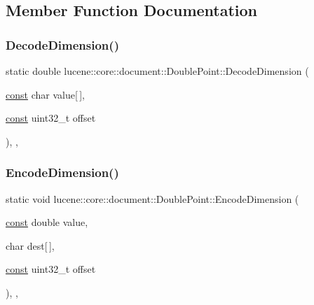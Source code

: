 \subsection{Member Function Documentation}
\mbox{\label{classlucene_1_1core_1_1document_1_1DoublePoint_abffe80eb3bb0bf46daceaff952a669b9}} 
\subsubsection{\texorpdfstring{Decode\+Dimension()}{DecodeDimension()}}
{\footnotesize\ttfamily static double lucene\+::core\+::document\+::\+Double\+Point\+::\+Decode\+Dimension (\begin{DoxyParamCaption}\item[{\mbox{\hyperlink{ZlibCrc32_8h_a2c212835823e3c54a8ab6d95c652660e}{const}} char}]{value\mbox{[}$\,$\mbox{]},  }\item[{\mbox{\hyperlink{ZlibCrc32_8h_a2c212835823e3c54a8ab6d95c652660e}{const}} uint32\+\_\+t}]{offset }\end{DoxyParamCaption})\hspace{0.3cm}{\ttfamily [inline]}, {\ttfamily [static]}, {\ttfamily [noexcept]}}

\mbox{\label{classlucene_1_1core_1_1document_1_1DoublePoint_a633e37e3ec07561f1af51e0215069cc5}} 
\subsubsection{\texorpdfstring{Encode\+Dimension()}{EncodeDimension()}}
{\footnotesize\ttfamily static void lucene\+::core\+::document\+::\+Double\+Point\+::\+Encode\+Dimension (\begin{DoxyParamCaption}\item[{\mbox{\hyperlink{ZlibCrc32_8h_a2c212835823e3c54a8ab6d95c652660e}{const}} double}]{value,  }\item[{char}]{dest\mbox{[}$\,$\mbox{]},  }\item[{\mbox{\hyperlink{ZlibCrc32_8h_a2c212835823e3c54a8ab6d95c652660e}{const}} uint32\+\_\+t}]{offset }\end{DoxyParamCaption})\hspace{0.3cm}{\ttfamily [inline]}, {\ttfamily [static]}, {\ttfamily [noexcept]}}

